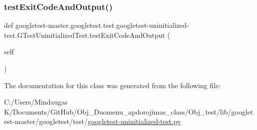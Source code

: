 \subsubsection{\texorpdfstring{testExitCodeAndOutput()}{testExitCodeAndOutput()}}
{\footnotesize\ttfamily def googletest-\/master.\+googletest.\+test.\+googletest-\/uninitialized-\/test.\+G\+Test\+Uninitialized\+Test.\+test\+Exit\+Code\+And\+Output (\begin{DoxyParamCaption}\item[{}]{self }\end{DoxyParamCaption})}



The documentation for this class was generated from the following file\+:\begin{DoxyCompactItemize}
\item 
C\+:/\+Users/\+Mindaugas K/\+Documents/\+Git\+Hub/\+Obj\+\_\+\+Duomenu\+\_\+apdorojimas\+\_\+class/\+Obj\+\_\+test/lib/googletest-\/master/googletest/test/\mbox{\hyperlink{_obj__test_2lib_2googletest-master_2googletest_2test_2googletest-uninitialized-test_8py}{googletest-\/uninitialized-\/test.\+py}}\end{DoxyCompactItemize}
